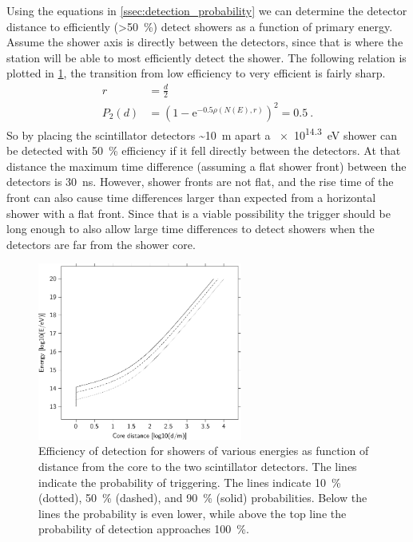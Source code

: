 Using the equations in \cref{ssec:detection_probability} we can determine the detector distance to efficiently (\SI{>50}{\percent}) detect showers as a function of primary energy. Assume the shower axis is directly between the detectors, since that is where the station will be able to most efficiently detect the shower. The following relation is plotted in \cref{fig:efficiency_distance_energy}, the transition from low efficiency to very efficient is fairly sharp.
%
\begin{equation}
\begin{split}
    r &= \frac{d}{2} \\
    P_2(d) &= \left(1 - \mathrm{e}^{-0.5 \rho(N(E), r)} \right)^2 = 0.5 \ .
\end{split}
\end{equation}
%
So by placing the scintillator detectors \SI{~10}{\meter} apart a \SI{e14.3}{\eV} shower can be detected with \SI{50}{\percent} efficiency if it fell directly between the detectors. At that distance the maximum time difference (assuming a flat shower front) between the detectors is \SI{30}{\ns}. However, shower fronts are not flat, and the rise time of the front can also cause time differences larger than expected from a horizontal shower with a flat front. Since that is a viable possibility the trigger should be long enough to also allow large time differences to detect showers when the detectors are far from the shower core.

\begin{figure}
    \centering
    \includegraphics[width=0.6\textwidth]
                    {plots/station/efficiency_distance_energy}
    \caption{Efficiency of detection for showers of various energies as function of distance from the core to the two scintillator detectors. The lines indicate the probability of triggering. The lines indicate \SI{10}{\percent} (dotted), \SI{50}{\percent} (dashed), and \SI{90}{\percent} (solid) probabilities. Below the lines the probability is even lower, while above the top line the probability of detection approaches \SI{100}{\percent}.}
    \label{fig:efficiency_distance_energy}
\end{figure}

